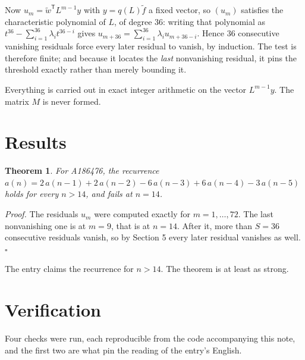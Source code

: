 \documentclass[11pt]{article}
\newtheorem{theorem}{Theorem}
\theoremstyle{definition}
\begin{document}
Now $u_m = \tilde w^{\mathsf T} L^{m-1} y$ with $y = q(L)\tilde f$ a fixed vector, so $(u_m)$ satisfies the characteristic polynomial of $L$, of degree $36$: writing that polynomial as $t^{36} - \sum_{i=1}^{36} \lambda_i t^{36-i}$ gives $u_{m+36} = \sum_{i=1}^{36} \lambda_i u_{m+36-i}$. Hence $36$ consecutive vanishing residuals force every later residual to vanish, by induction. The test is therefore finite; and because it locates the {\itshape last} nonvanishing residual, it pins the threshold exactly rather than merely bounding it.

Everything is carried out in exact integer arithmetic on the vector $L^{m-1}y$. The matrix $M$ is never formed.

\section{Results}

\begin{theorem} For A186476, the recurrence $a(n) = 2\,a(n-1) + 2\,a(n-2) - 6\,a(n-3) + 6\,a(n-4) - 3\,a(n-5)$ holds for every $n > 14$, and fails at $n = 14$.\end{theorem}

{\itshape Proof.} The residuals $u_m$ were computed exactly for $m = 1,\dots,72$. The last nonvanishing one is at $m = 9$, that is at $n = 14$. After it, more than $S = 36$ consecutive residuals vanish, so by Section 5 every later residual vanishes as well. $\square$

The entry claims the recurrence for $n > 14$. The theorem is at least as strong.

\section{Verification}

Four checks were run, each reproducible from the code accompanying this note, and the first two are what pin the reading of the entry's English.
\end{document}
